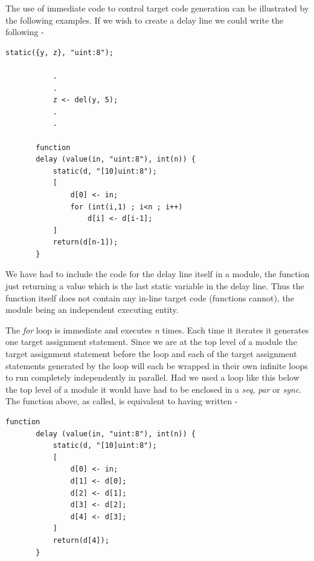     The use of immediate code to control target code generation can
    be illustrated by the following examples. If we wish to create
    a delay line we could write the following -
    \begin{lstlisting}[gobble=4, language=threepl]
           static({y, z}, "uint:8");

           .
           .
           z <- del(y, 5);
           .
           .

       function
       delay (value(in, "uint:8"), int(n)) {
           static(d, "[10]uint:8");
           [
               d[0] <- in;
               for (int(i,1) ; i<n ; i++)
                   d[i] <- d[i-1];
           ]
           return(d[n-1]);
       }
    \end{lstlisting}
    We have had to include the code for the delay line itself in a module,
    the function just returning a value which is the last static variable in
    the delay line. Thus the function itself does not contain any in-line
    target code (functions cannot), the module being an independent executing
    entity.
    
    The {\em for} loop is immediate and executes {\em n} times. Each time it
    iterates it generates one target assignment statement. Since we are at
    the top level of a module the target assignment statement before the loop
    and each of the target assignment statements generated by the loop will
    each be wrapped in their own infinite loops to run completely
    independently in parallel. Had we used a loop like this below the top
    level of a module it would have had to be enclosed in a {\em seq}, {\em
    par} or {\em sync}. The function above, as called, is equivalent to
    having written -
    \begin{lstlisting}[gobble=4, language=threepl]
       function
       delay (value(in, "uint:8"), int(n)) {
           static(d, "[10]uint:8");
           [
               d[0] <- in;
               d[1] <- d[0];
               d[2] <- d[1];
               d[3] <- d[2];
               d[4] <- d[3];
           ]
           return(d[4]);
       }
    \end{lstlisting}
    
